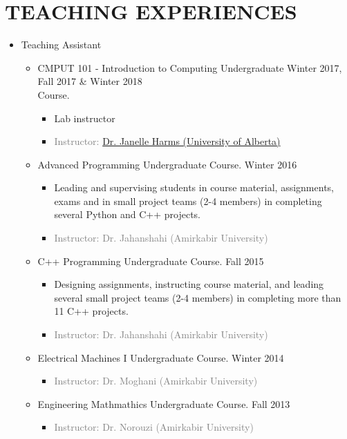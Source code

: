 \section{TEACHING EXPERIENCES}
\begin{itemize}
	\item Teaching Assistant
	\begin{itemize}
	
		\item {} CMPUT 101 - Introduction to Computing Undergraduate  \hfill Winter 2017, Fall 2017 \& Winter 2018
		\\ Course.
		\begin{itemize} 
			\item Lab instructor
			
			\item\textcolor{gray}{Instructor: \href{https://webdocs.cs.ualberta.ca/~harms/}{Dr. Janelle Harms (University of Alberta)}}
		\end{itemize}
			
		\item {} Advanced Programming Undergraduate Course. \hfill Winter 2016
		\begin{itemize} 
			\item Leading and supervising students in course material, assignments, exams and in small project teams (2-4 members) in completing several Python and C++ projects.
			\item\textcolor{gray}{Instructor: Dr. Jahanshahi (Amirkabir University)}
		\end{itemize}
		
		\item {} C++ Programming Undergraduate Course. \hfill Fall 2015
		\begin{itemize} 
			\item Designing assignments, instructing course material, and leading several small project teams (2-4 members) in completing more than 11 C++ projects.
			\item \textcolor{gray}{Instructor: Dr. Jahanshahi (Amirkabir University)}
		\end{itemize}
		
		\item {} Electrical Machines I Undergraduate Course. \hfill Winter 2014
		\begin{itemize} 
			\item \textcolor{gray}{Instructor: Dr. Moghani (Amirkabir University)}
		\end{itemize}
		
		\item {} Engineering Mathmathics Undergraduate Course. \hfill Fall 2013
		\begin{itemize} 
			\item\textcolor{gray}{Instructor: Dr. Norouzi (Amirkabir University)} 
		\end{itemize}
	
	\end{itemize}
\end{itemize}

